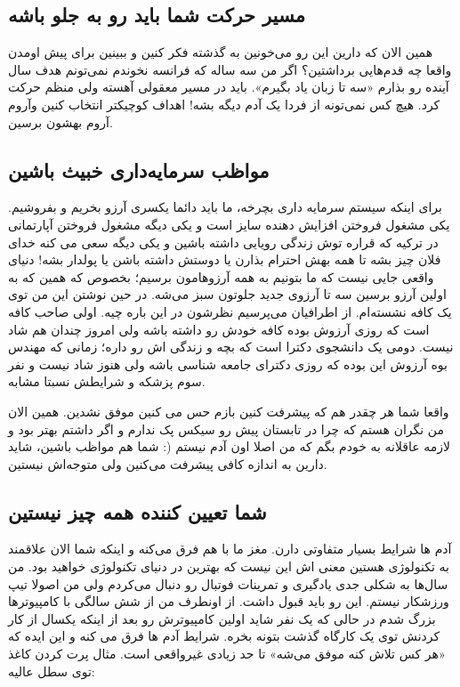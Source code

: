 \subsection*{مسیر حرکت شما باید رو به جلو باشه}
همین الان که دارین این رو می‌خونین به گذشته فکر کنین و ببینین برای پیش اومدن واقعا چه قدم‌هایی برداشتین؟ اگر من سه ساله که فرانسه نخوندم نمی‌تونم هدف سال آینده رو بذارم «سه تا زبان یاد بگیرم». باید در مسیر معقولی آهسته ولی منظم حرکت کرد. هیچ کس نمی‌تونه از فردا یک آدم دیگه بشه! اهداف کوچیکتر انتخاب کنین و‌آروم آروم بهشون برسین.
\subsection*{مواظب سرمایه‌داری خبیث باشین}
برای اینکه سیستم سرمایه داری بچرخه، ما باید دائما یکسری آرزو بخریم و بفروشیم. یکی مشغول فروختن افزایش دهنده سایز است و یکی دیگه مشغول فروختن آپارتمانی در ترکیه که قراره توش زندگی رویایی داشته باشین و یکی دیگه سعی می کنه خدای فلان چیز بشه تا همه بهش احترام بذارن یا دوستش داشته باشن یا پولدار بشه! دنیای واقعی جایی نیست که ما بتونیم به همه آرزوهامون برسیم؛ بخصوص که همین که به اولین آرزو برسین سه تا آرزوی جدید جلوتون سبز می‌شه. در حین نوشتن این من توی یک کافه نشسته‌ام. از اطرافیان می‌پرسیم نظرشون در این باره چیه. اولی صاحب کافه است که روزی آرزوش بوده کافه خودش رو داشته باشه ولی امروز چندان هم شاد نیست. دومی یک دانشجوی دکترا است که بچه و زندگی اش رو داره؛ زمانی که مهندس بوه آرزوش این بوده که روزی دکترای جامعه شناسی باشه ولی هنوز شاد نیست و نفر سوم پزشکه و شرایطش نسبتا مشابه.

واقعا شما هر چقدر هم که پیشرفت کنین بازم حس می کنین موفق نشدین. همین الان من نگران هستم که چرا در تابستان پیش رو سیکس پک ندارم و اگر داشتم بهتر بود و لازمه عاقلانه به خودم بگم که من اصلا اون آدم نیستم (: شما هم مواظب باشین، شاید دارین به اندازه کافی پیشرفت می‌کنین ولی متوجه‌اش نیستین.
\subsection*{شما تعیین کننده همه چیز نیستین}
آدم ها شرایط بسیار متفاوتی دارن. مغز ما با هم فرق می‌کنه و اینکه شما الان علاقمند به تکنولوژی هستین معنی اش این نیست که بهترین در دنیای تکنولوژی خواهید بود. من سال‌ها به شکلی جدی یادگیری و تمرینات فوتبال رو دنبال می‌کردم ولی من اصولا تیپ ورزشکار نیستم. این رو باید قبول داشت. از اونطرف من از شش سالگی با کامپیوترها بزرگ شدم در حالی که یک نفر شاید اولین کامپیوترش رو بعد از اینکه یکسال از کار کردنش توی یک کارگاه گذشت بتونه بخره. شرایط آدم ها فرق می کنه و این ایده که «هر کس تلاش کنه موفق می‌شه» تا حد زیادی غیرواقعی است. مثال پرت کردن کاغذ توی سطل عالیه:

